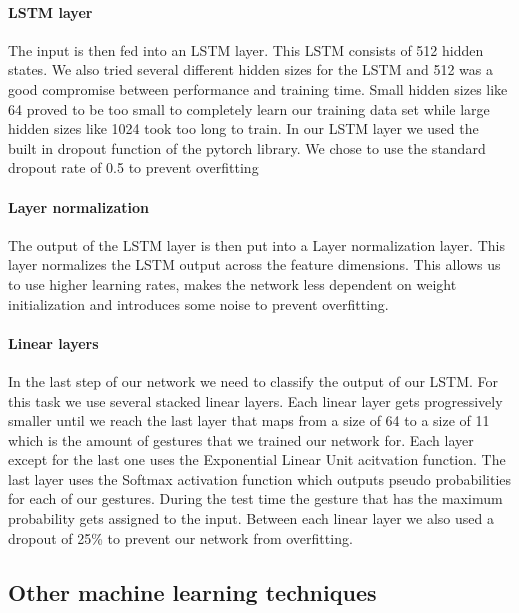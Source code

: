 \documentclass[runningheads]{llncs}
\begin{document}
\paragraph{LSTM layer}
The input is then fed into an LSTM layer. This LSTM consists of 512 hidden states. We also tried several different hidden sizes for the LSTM and 512 was a good compromise between performance and training time. Small hidden sizes like 64 proved to be too small to completely learn our training data set while large hidden sizes like 1024 took too long to train. In our LSTM layer we used the built in dropout function of the pytorch library. We chose to use the standard dropout rate of 0.5 to prevent overfitting
\paragraph{Layer normalization}
The output of the LSTM layer is then put into a Layer normalization layer. This layer normalizes the LSTM output across the feature dimensions. This allows us to use higher learning rates, makes the network less dependent on weight initialization and introduces some noise to prevent overfitting.
\paragraph{Linear layers}
In the last step of our network we need to classify the output of our LSTM. For this task we use several stacked linear layers. Each linear layer gets progressively smaller until we reach the last layer that maps from a size of 64 to a size of 11 which is the amount of gestures that we trained our network for. Each layer except for the last one uses the Exponential Linear Unit acitvation function. The last layer uses the Softmax activation function which outputs pseudo probabilities for each of our gestures. During the test time the gesture that has the maximum probability gets assigned to the input. Between each linear layer we also used a dropout of 25\% to prevent our network from overfitting.

\subsection{Other machine learning techniques}
\end{document}
